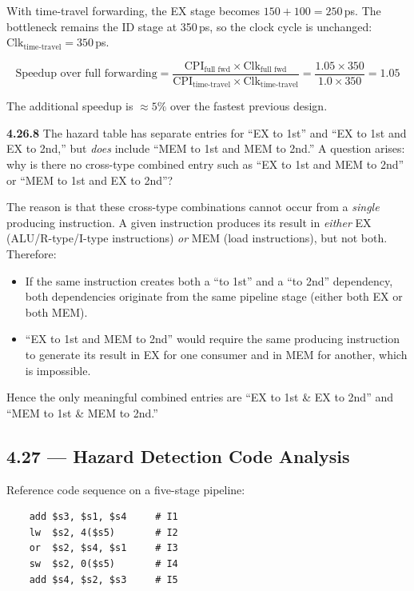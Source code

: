 With time-travel forwarding, the EX stage becomes $150 + 100 = 250$\,ps. The
bottleneck remains the ID stage at 350\,ps, so the clock cycle is unchanged:
$\text{Clk}_{\text{time-travel}} = 350$\,ps.

\[
  \text{Speedup over full forwarding}
  = \frac{\text{CPI}_{\text{full fwd}} \times \text{Clk}_{\text{full fwd}}}
         {\text{CPI}_{\text{time-travel}} \times \text{Clk}_{\text{time-travel}}}
  = \frac{1.05 \times 350}{1.0 \times 350}
  = 1.05
\]

The additional speedup is $\approx 5\%$ over the fastest previous design.

\medskip\noindent\textbf{4.26.8}
The hazard table has separate entries for ``EX to 1st'' and ``EX to 1st and EX
to 2nd,'' but \emph{does} include ``MEM to 1st and MEM to 2nd.'' A question
arises: why is there no cross-type combined entry such as ``EX to 1st and MEM
to 2nd'' or ``MEM to 1st and EX to 2nd''?

The reason is that these cross-type combinations cannot occur from a
\emph{single} producing instruction. A given instruction produces its result
in \emph{either} EX (ALU/R-type/I-type instructions) \emph{or} MEM (load
instructions), but not both. Therefore:

\begin{itemize}
  \item If the same instruction creates both a ``to 1st'' and a ``to 2nd''
    dependency, both dependencies originate from the same pipeline stage
    (either both EX or both MEM).
  \item ``EX to 1st and MEM to 2nd'' would require the same producing
    instruction to generate its result in EX for one consumer and in MEM for
    another, which is impossible.
\end{itemize}

Hence the only meaningful combined entries are ``EX to 1st \& EX to 2nd'' and
``MEM to 1st \& MEM to 2nd.''

\subsection*{4.27 --- Hazard Detection Code Analysis}
\hypertarget{sol-4.27}{}

Reference code sequence on a five-stage pipeline:
\begin{verbatim}
    add $s3, $s1, $s4     # I1
    lw  $s2, 4($s5)       # I2
    or  $s2, $s4, $s1     # I3
    sw  $s2, 0($s5)       # I4
    add $s4, $s2, $s3     # I5
\end{verbatim}

